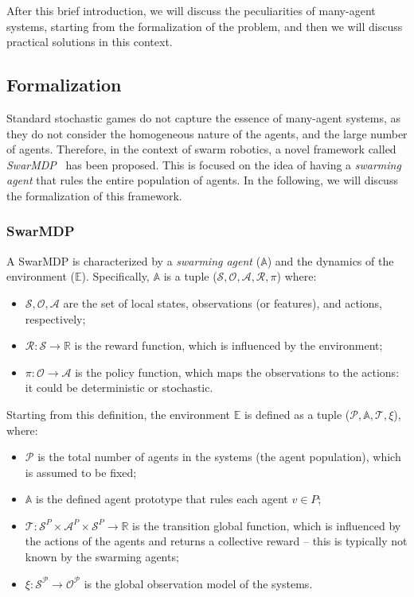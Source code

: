 After this brief introduction, 
 we will discuss the peculiarities of many-agent systems,
 starting from the formalization of the problem,
  and then we will discuss practical solutions in this context.
\subsection{Formalization}
Standard stochastic games do not capture the essence of many-agent systems, 
 as they do not consider the homogeneous nature of the agents, and the large number of agents.
Therefore, in the context of swarm robotics, 
 a novel framework called \emph{SwarMDP}~\cite{vsovsic2016inverse} has been proposed.
 This is focused on the idea of having a \emph{swarming agent} that rules the entire population of agents.
 In the following, we will discuss the formalization of this framework.
\subsubsection{SwarMDP}
A SwarMDP is characterized by a \emph{swarming agent} ($\mathbb{A}$) and the dynamics of the environment ($\mathbb{E}$).
Specifically, $\mathbb{A}$ is a tuple ($\mathcal{S}, \mathcal{O}, \mathcal{A}, \mathcal{R}, \pi$) where:
\begin{itemize}
  \item $\mathcal{S, O, A}$ are the set of local states, observations (or features), and actions, respectively;
  \item $\mathcal{R}: \mathcal{S} \rightarrow \mathbb{R}$ is the reward function, which is influenced by the environment;
  \item $\pi: \mathcal{O} \rightarrow \mathcal{A}$ is the policy function, which maps the observations to the actions: it could be deterministic or stochastic.
\end{itemize}
Starting from this definition, the environment $\mathbb{E}$ is defined as a tuple ($\mathcal{P}, \mathbb{A}, \mathcal{T}, \xi$), where:
\begin{itemize}
  \item $\mathcal{P}$ is the total number of agents in the systems (the agent population), which is assumed to be fixed;
  \item $\mathbb{A}$ is the defined agent prototype that rules each agent $v \in P$;
  \item $\mathcal{T}: \mathcal{S}^P \times \mathcal{A}^P \times \mathcal{S}^P \rightarrow \mathbb{R}$ is the transition  global function, which is influenced by the actions of the agents and returns a collective reward -- this is typically not known by the swarming agents;
  \item $\xi: \mathcal{S^P} \rightarrow \mathcal{O^P}$ is the global observation model of the systems.
\end{itemize}

